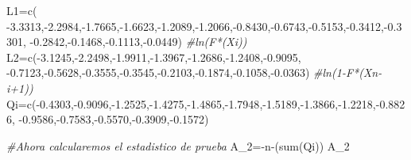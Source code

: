\documentclass[
  a4paper,
  oneside,
  openany]{book}
\newenvironment{Shaded}{\begin{snugshade}}{\end{snugshade}}
\newcommand{\CommentTok}[1]{\textcolor[rgb]{0.56,0.35,0.01}{\textit{#1}}}
\newcommand{\FloatTok}[1]{\textcolor[rgb]{0.00,0.00,0.81}{#1}}
\newcommand{\FunctionTok}[1]{\textcolor[rgb]{0.00,0.00,0.00}{#1}}
\newcommand{\NormalTok}[1]{#1}
\newcommand{\OtherTok}[1]{\textcolor[rgb]{0.56,0.35,0.01}{#1}}
\newcommand{\SpecialCharTok}[1]{\textcolor[rgb]{0.00,0.00,0.00}{#1}}
\begin{document}
\begin{Shaded}
\begin{Highlighting}[]
\NormalTok{L1}\OtherTok{=}\FunctionTok{c}\NormalTok{( }\SpecialCharTok{{-}}\FloatTok{3.3313}\NormalTok{,}\SpecialCharTok{{-}}\FloatTok{2.2984}\NormalTok{,}\SpecialCharTok{{-}}\FloatTok{1.7665}\NormalTok{,}\SpecialCharTok{{-}}\FloatTok{1.6623}\NormalTok{,}\SpecialCharTok{{-}}\FloatTok{1.2089}\NormalTok{,}\SpecialCharTok{{-}}\FloatTok{1.2066}\NormalTok{,}\SpecialCharTok{{-}}\FloatTok{0.8430}\NormalTok{,}\SpecialCharTok{{-}}\FloatTok{0.6743}\NormalTok{,}\SpecialCharTok{{-}}\FloatTok{0.5153}\NormalTok{,}\SpecialCharTok{{-}}\FloatTok{0.3412}\NormalTok{,}\SpecialCharTok{{-}}\FloatTok{0.3301}\NormalTok{,}
      \SpecialCharTok{{-}}\FloatTok{0.2842}\NormalTok{,}\SpecialCharTok{{-}}\FloatTok{0.1468}\NormalTok{,}\SpecialCharTok{{-}}\FloatTok{0.1113}\NormalTok{,}\SpecialCharTok{{-}}\FloatTok{0.0449}\NormalTok{)    }\CommentTok{\#ln(F*(Xi))}
\NormalTok{L2}\OtherTok{=}\FunctionTok{c}\NormalTok{(}\SpecialCharTok{{-}}\FloatTok{3.1245}\NormalTok{,}\SpecialCharTok{{-}}\FloatTok{2.2498}\NormalTok{,}\SpecialCharTok{{-}}\FloatTok{1.9911}\NormalTok{,}\SpecialCharTok{{-}}\FloatTok{1.3967}\NormalTok{,}\SpecialCharTok{{-}}\FloatTok{1.2686}\NormalTok{,}\SpecialCharTok{{-}}\FloatTok{1.2408}\NormalTok{,}\SpecialCharTok{{-}}\FloatTok{0.9095}\NormalTok{,}
\SpecialCharTok{{-}}\FloatTok{0.7123}\NormalTok{,}\SpecialCharTok{{-}}\FloatTok{0.5628}\NormalTok{,}\SpecialCharTok{{-}}\FloatTok{0.3555}\NormalTok{,}\SpecialCharTok{{-}}\FloatTok{0.3545}\NormalTok{,}\SpecialCharTok{{-}}\FloatTok{0.2103}\NormalTok{,}\SpecialCharTok{{-}}\FloatTok{0.1874}\NormalTok{,}\SpecialCharTok{{-}}\FloatTok{0.1058}\NormalTok{,}\SpecialCharTok{{-}}\FloatTok{0.0363}\NormalTok{)  }\CommentTok{\#ln(1{-}F*(Xn{-}i+1))}
\NormalTok{Qi}\OtherTok{=}\FunctionTok{c}\NormalTok{(}\SpecialCharTok{{-}}\FloatTok{0.4303}\NormalTok{,}\SpecialCharTok{{-}}\FloatTok{0.9096}\NormalTok{,}\SpecialCharTok{{-}}\FloatTok{1.2525}\NormalTok{,}\SpecialCharTok{{-}}\FloatTok{1.4275}\NormalTok{,}\SpecialCharTok{{-}}\FloatTok{1.4865}\NormalTok{,}\SpecialCharTok{{-}}\FloatTok{1.7948}\NormalTok{,}\SpecialCharTok{{-}}\FloatTok{1.5189}\NormalTok{,}\SpecialCharTok{{-}}\FloatTok{1.3866}\NormalTok{,}\SpecialCharTok{{-}}\FloatTok{1.2218}\NormalTok{,}\SpecialCharTok{{-}}\FloatTok{0.8826}\NormalTok{,}
\SpecialCharTok{{-}}\FloatTok{0.9586}\NormalTok{,}\SpecialCharTok{{-}}\FloatTok{0.7583}\NormalTok{,}\SpecialCharTok{{-}}\FloatTok{0.5570}\NormalTok{,}\SpecialCharTok{{-}}\FloatTok{0.3909}\NormalTok{,}\SpecialCharTok{{-}}\FloatTok{0.1572}\NormalTok{)}

\CommentTok{\#Ahora calcularemos el estadistico de prueba}
\NormalTok{A\_2}\OtherTok{=}\SpecialCharTok{{-}}\NormalTok{n}\SpecialCharTok{{-}}\NormalTok{(}\FunctionTok{sum}\NormalTok{(Qi))}
\NormalTok{A\_2}
\end{Highlighting}
\end{Shaded}
\end{document}
